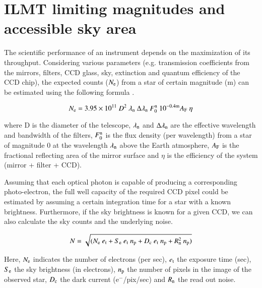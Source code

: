 \documentclass[useAMS,usenatbib]{mnras}
\begin{document}

\section{ILMT limiting magnitudes and accessible sky area}\label{Estimation1}

The scientific performance of an instrument depends on the maximization of its throughput.
Considering various parameters (e.g. transmission coefficients from the mirrors, filters, 
CCD glass, sky, extinction and quantum efficiency of the CCD chip), the expected counts ($N_{\rm e}$) 
from a star of certain magnitude (m) can be estimated using the following formula 
\citep{1989ecaa.book.....M,1991JApA...12..319M}.   

\begin{equation}
N_{\rm e} = 3.95 \times 10^{11} ~ D^{2} ~ \lambda_{\rm n} ~ \Delta\lambda_{\rm n} ~ F_{0}^{\rm n} ~ 10^{-0.4{\rm m}} 
A_{\rm F} ~ \eta 
\end{equation}

where D is the diameter of the telescope, $\lambda_{\rm n}$ and $\Delta\lambda_{\rm n}$ are
the effective wavelength and bandwidth of the filters, $F_{0}^{\rm n}$ is the flux density 
(per wavelength) from a star of magnitude 0 at the wavelength $\lambda_{\rm n}$ above 
the Earth atmosphere, $A_{\rm F}$ is the fractional reflecting area of the mirror surface and 
$\eta$ is the efficiency of the system (mirror + filter + CCD).

Assuming that each optical photon is capable of producing a corresponding photo-electron, 
the full well capacity of the required CCD pixel could be estimated by assuming a certain 
integration time for a star with a known brightness. 
Furthermore, if the sky brightness is known for a given CCD, we can also calculate the sky 
counts and the underlying noise. 

\begin{equation}
N  = \sqrt{(N_{\rm e} ~ e_{\rm t} + S_{\rm e} ~ e_{\rm t} ~ n_{\rm p} + D_{\rm c} ~ e_{\rm t} ~ n_{\rm p} 
+ R_{\rm n}^2 ~ n_{\rm p})}
\end{equation}

Here, 
$N_{\rm e}$ indicates the number of electrons (per sec), $e_{\rm t}$ the exposure time (sec), 
$S_{\rm e}$ the sky brightness (in electrons), $n_{\rm p}$ the number of pixels in the image of the 
observed star, $D_{\rm c}$ the dark current (e$^-$/pix/sec) and $R_{\rm n}$ the read out noise.
\end{document}
